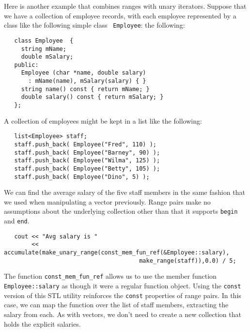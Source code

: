 \documentclass[12pt]{article}
\begin{document}
  Here is another example that combines ranges with unary iterators.
Suppose that we have a collection of employee records, with each
employee represented by a class like the following simple class {\tt
Employee}: the following:
\begin{verbatim}
   class Employee  {
     string mName;
     double mSalary;
   public:
     Employee (char *name, double salary)
       : mName(name), mSalary(salary) { }
     string name() const { return mName; }
     double salary() const { return mSalary; }
   };
\end{verbatim}
A collection of employees might be kept in a list like the
following: 
\begin{verbatim}
   list<Employee> staff;
   staff.push_back( Employee("Fred", 110) );
   staff.push_back( Employee("Barney", 90) );
   staff.push_back( Employee("Wilma", 125) );
   staff.push_back( Employee("Betty", 105) );
   staff.push_back( Employee("Dino", 5) );
\end{verbatim}
We can find the average salary of the five staff members in the same
fashion that we used when manipulating a vector previously. Range pairs
make no assumptions about the underlying collection other than that it
supports {\tt begin} and {\tt end}.
\begin{verbatim}
   cout << "Avg salary is "
        << accumulate(make_unary_range(const_mem_fun_ref(&Employee::salary), 
                                       make_range(staff)),0.0) / 5;
\end{verbatim}
The function {\tt const\_mem\_fun\_ref} allows us to use the member
function {\tt Employee::salary} as though it were a regular function
object. Using the {\tt const} version of this STL utility reinforces
the {\tt const} properties of range pairs.  In this case, we can map
the function over the list of staff members, extracting the salary
from each. As with vectors, we don't need to create a new collection
that holds the explicit salaries.
\end{document}
